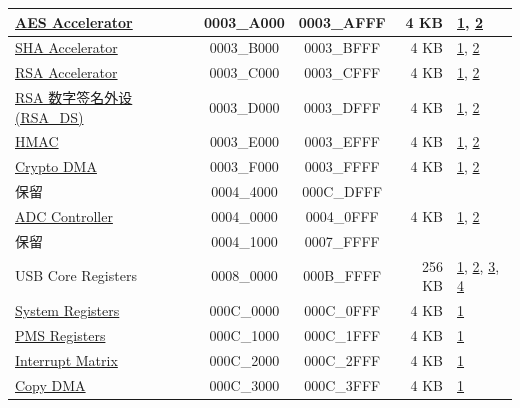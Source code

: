 \begin{longtable}[c]{ |p{5.0cm}|c|c|r|p{1.5cm}| }
               \hyperref[mod:aes]{AES Accelerator}   & \hexprefix{}0003\_A000 & \hexprefix{}0003\_AFFF &   4 KB    & \hyperref[PAM footnote: 1]{1}, \hyperref[PAM footnote: 2]{2}     \\\hline
                \hyperref[mod:sha]{SHA Accelerator}   & \hexprefix{}0003\_B000 & \hexprefix{}0003\_BFFF &   4 KB        & \hyperref[PAM footnote: 1]{1}, \hyperref[PAM footnote: 2]{2}     \\\hline

                \hyperref[mod:rsa]{RSA Accelerator}   & \hexprefix{}0003\_C000 & \hexprefix{}0003\_CFFF &   4 KB         & \hyperref[PAM footnote: 1]{1}, \hyperref[PAM footnote: 2]{2}     \\\hline
                \hyperref[mod:digsig]{RSA 数字签名外设 (RSA\_DS)}   & \hexprefix{}0003\_D000 & \hexprefix{}0003\_DFFF &   4 KB  & \hyperref[PAM footnote: 1]{1}, \hyperref[PAM footnote: 2]{2}     \\\hline
               \hyperref[mod:hmac]{HMAC}    & \hexprefix{}0003\_E000 & \hexprefix{}0003\_EFFF &   4 KB    & \hyperref[PAM footnote: 1]{1}, \hyperref[PAM footnote: 2]{2}     \\\hline
                 \hyperref[mod:dma]{Crypto DMA}  & \hexprefix{}0003\_F000 & \hexprefix{}0003\_FFFF &   4 KB  & \hyperref[PAM footnote: 1]{1}, \hyperref[PAM footnote: 2]{2}     \\\hline

    \rowcolor{gray!25}
  保留  & \hexprefix{}0004\_4000 & \hexprefix{}000C\_DFFF &        &                    \\\hline
              \hyperref[mod:sensor]{ADC Controller}     & \hexprefix{}0004\_0000 & \hexprefix{}0004\_0FFF &   4 KB  & \hyperref[PAM footnote: 1]{1}, \hyperref[PAM footnote: 2]{2}     \\\hline
    \rowcolor{gray!25}
  保留  & \hexprefix{}0004\_1000 & \hexprefix{}0007\_FFFF &        &                 \\\hline
              USB Core Registers     & \hexprefix{}0008\_0000 & \hexprefix{}000B\_FFFF & 256 KB    & \hyperref[PAM footnote: 1]{1}, \hyperref[PAM footnote: 2]{2}, \hyperref[PAM footnote: 3]{3}, \hyperref[PAM footnote: 4]{4}  \\\hline
               \hyperref[mod:sysreg]{System Registers}    & \hexprefix{}000C\_0000 & \hexprefix{}000C\_0FFF &   4 KB    & \hyperref[PAM footnote: 1]{1}         \\\hline
                \hyperref[mod:permctrl]{PMS Registers}   & \hexprefix{}000C\_1000 & \hexprefix{}000C\_1FFF &   4 KB  & \hyperref[PAM footnote: 1]{1}         \\\hline
               \hyperref[mod:intmtrx]{Interrupt Matrix}    & \hexprefix{}000C\_2000 & \hexprefix{}000C\_2FFF &   4 KB   & \hyperref[PAM footnote: 1]{1}         \\\hline
             \hyperref[mod:dma]{Copy DMA}      & \hexprefix{}000C\_3000 & \hexprefix{}000C\_3FFF &   4 KB    & \hyperref[PAM footnote: 1]{1}         \\\hline


\end{longtable}
